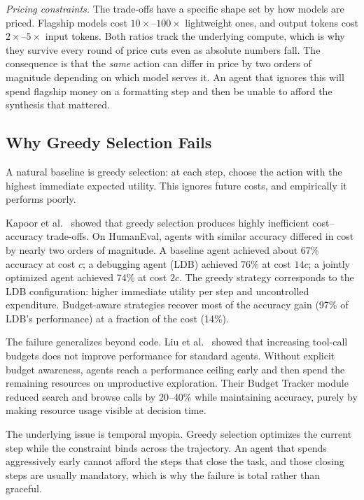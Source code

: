 \documentclass[11pt]{book}
\begin{document}
\textit{Pricing constraints.} The trade-offs have a specific shape set by how models are priced. Flagship models cost $10\times$--$100\times$ lightweight ones, and output tokens cost $2\times$--$5\times$ input tokens. Both ratios track the underlying compute, which is why they survive every round of price cuts even as absolute numbers fall. The consequence is that the \textit{same} action can differ in price by two orders of magnitude depending on which model serves it. An agent that ignores this will spend flagship money on a formatting step and then be unable to afford the synthesis that mattered.

\subsection{Why Greedy Selection Fails}

A natural baseline is greedy selection: at each step, choose the action with the highest immediate expected utility. This ignores future costs, and empirically it performs poorly.

Kapoor et al.\ \cite{kapoor2024agents} showed that greedy selection produces highly inefficient cost--accuracy trade-offs. On HumanEval, agents with similar accuracy differed in cost by nearly two orders of magnitude. A baseline agent achieved about 67\% accuracy at cost $c$; a debugging agent (LDB) achieved 76\% at cost $14c$; a jointly optimized agent achieved 74\% at cost $2c$. The greedy strategy corresponds to the LDB configuration: higher immediate utility per step and uncontrolled expenditure. Budget-aware strategies recover most of the accuracy gain (97\% of LDB's performance) at a fraction of the cost (14\%).

The failure generalizes beyond code. Liu et al.\ \cite{liu2025bats} showed that increasing tool-call budgets does not improve performance for standard agents. Without explicit budget awareness, agents reach a performance ceiling early and then spend the remaining resources on unproductive exploration. Their Budget Tracker module reduced search and browse calls by 20--40\% while maintaining accuracy, purely by making resource usage visible at decision time.

The underlying issue is temporal myopia. Greedy selection optimizes the current step while the constraint binds across the trajectory. An agent that spends aggressively early cannot afford the steps that close the task, and those closing steps are usually mandatory, which is why the failure is total rather than graceful.
\end{document}
